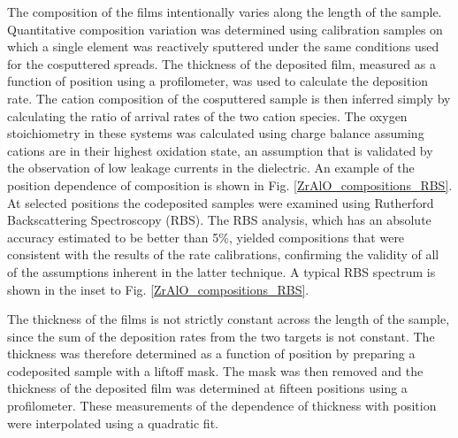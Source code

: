 The composition of the films intentionally varies along the length of the sample.  Quantitative composition variation was determined using calibration samples on which a single element was reactively sputtered under the same conditions used for the cosputtered spreads.  The thickness of the deposited film, measured as a function of position using a profilometer, was used to calculate the deposition rate.  The cation composition of the cosputtered sample is then inferred simply by calculating the ratio of arrival rates of the two cation species.  The oxygen stoichiometry in these systems was calculated using charge balance assuming cations are in their highest oxidation state, an assumption that is validated by the observation of low leakage currents in the dielectric. An example of the position dependence of composition is shown in Fig. \ref{ZrAlO_compositions_RBS}.  At selected positions the codeposited samples were examined using Rutherford Backscattering Spectroscopy (RBS).  The RBS analysis, which has an absolute accuracy estimated to be better than 5\%, yielded compositions that were consistent with the results of the rate calibrations, confirming the validity of all of the assumptions inherent in the latter technique.  A typical RBS spectrum is shown in the inset to Fig. \ref{ZrAlO_compositions_RBS}.

The thickness of the films is not strictly constant across the length of the sample, since the sum of the deposition rates from the two targets is not constant.  The thickness was therefore determined as a function of position by preparing a codeposited sample with a liftoff mask.  The mask was then removed and the thickness of the deposited film was determined at fifteen positions using a profilometer.  These measurements of the dependence of thickness with position were interpolated using a quadratic fit.

